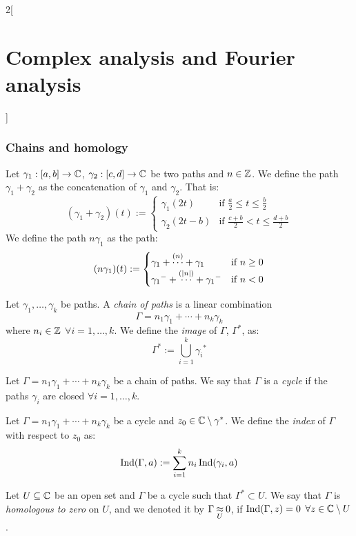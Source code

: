 \documentclass[../../../main.tex]{subfiles}
\begin{document}
\begin{multicols}{2}[\section{Complex analysis and Fourier analysis}]
  \subsubsection{Chains and homology}
  \begin{definition}
    Let $\gamma_1:[a,b]\rightarrow\mathbb{C}$, $\gamma_2:[c,d]\rightarrow\mathbb{C}$ be two paths and $n\in\mathbb{Z}$. We define the path $\gamma_1+\gamma_2$ as the concatenation of $\gamma_1$ and $\gamma_2$. That is:
    $$
      (\gamma_1+\gamma_2)(t):=
      \begin{cases}
        \gamma_1(2t)   & \text{if }\frac{a}{2}\leq t\leq \frac{b}{2}  \\
        \gamma_2(2t-b) & \text{if }\frac{c+b}{2} <t\leq \frac{d+b}{2}
      \end{cases}
    $$
    We define the path $n\gamma_1$ as the path:
    $$
      (n\gamma_1)(t):=
      \begin{cases}
        \gamma_1+\overset{(n)}{\cdots}+\gamma_1               & \text{if }n\geq 0 \\
        {\gamma_1}^-+\overset{(\abs{n})}{\cdots}+{\gamma_1}^- & \text{if }n<0
      \end{cases}
    $$
  \end{definition}
  \begin{definition}
    Let $\gamma_1,\ldots,\gamma_k$ be paths. A \emph{chain of paths} is a linear combination $$\Gamma=n_1\gamma_1+\cdots+n_k\gamma_k$$ where $n_i\in\mathbb{Z}$ $\forall i=1,\ldots,k$. We define the \emph{image} of $\Gamma$, $\Gamma^*$, as:
    $$\Gamma^*:=\bigcup_{i=1}^k{\gamma_i}^*$$
  \end{definition}
  \begin{definition}
    Let $\Gamma=n_1\gamma_1+\cdots+n_k\gamma_k$ be a chain of paths. We say that $\Gamma$ is a \emph{cycle} if the paths $\gamma_i$ are closed $\forall i=1,\ldots,k$.
  \end{definition}
  \begin{definition}
    Let $\Gamma=n_1\gamma_1+\cdots+n_k\gamma_k$ be a cycle and $z_0\in\mathbb{C}\setminus\gamma^*$. We define the \emph{index} of $\Gamma$ with respect to $z_0$ as: $$\operatorname{Ind}(\Gamma,a):=\sum_{i=1}^kn_i\operatorname{Ind}(\gamma_i,a)$$
  \end{definition}
  \begin{definition}
    Let $U\subseteq \mathbb{C}$ be an open set and $\Gamma$ be a cycle such that $\Gamma^*\subset U$. We say that $\Gamma$ is \emph{homologous to zero} on $U$, and we denoted it by $\Gamma\mathbin{\underset{U}{\approx}} 0$, if $\operatorname{Ind}(\Gamma,z)=0$ $\forall z\in\mathbb{C}\setminus U$.
  \end{definition}

\end{multicols}
\end{document}
